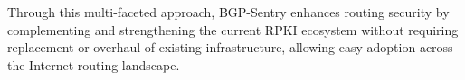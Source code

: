 


Through this multi-faceted approach, BGP-Sentry enhances routing security by complementing and strengthening the current RPKI ecosystem without requiring replacement or overhaul of existing infrastructure, allowing easy adoption across the Internet routing landscape.





